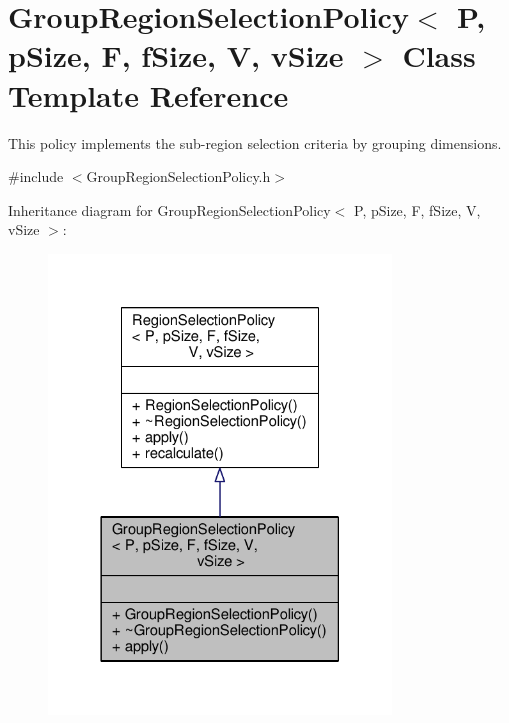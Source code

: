 \hypertarget{classGroupRegionSelectionPolicy}{}\section{Group\+Region\+Selection\+Policy$<$ P, p\+Size, F, f\+Size, V, v\+Size $>$ Class Template Reference}
\label{classGroupRegionSelectionPolicy}


This policy implements the sub-\/region selection criteria by grouping dimensions.  




{\ttfamily \#include $<$Group\+Region\+Selection\+Policy.\+h$>$}



Inheritance diagram for Group\+Region\+Selection\+Policy$<$ P, p\+Size, F, f\+Size, V, v\+Size $>$\+:
\nopagebreak
\begin{figure}[H]
\begin{center}
\leavevmode
\includegraphics[width=258pt]{classGroupRegionSelectionPolicy__inherit__graph}
\end{center}
\end{figure}


